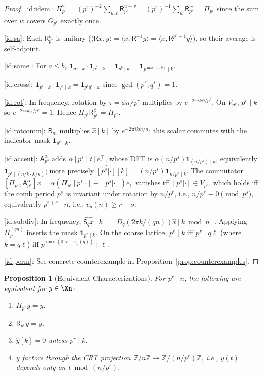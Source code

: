 \documentclass[11pt]{amsart}
\newtheorem{proposition}[theorem]{Proposition}
\newcommand{\Prj}{\Pi}
\newcommand{\Sp}{\mathsf{S}}
\newcommand{\Ap}{\mathsf{A}}
\newcommand{\Rp}{\mathsf{R}}
\newcommand{\vp}{v_p}
\newcommand{\Z}{\mathbb{Z}}
\begin{document}
\begin{proof}
\eqref{id:idem}: $\Prj_{p^r}^2 = (p^r)^{-2}\sum_{u,v}\Rp_{p^r}^{u+v} = (p^r)^{-1}\sum_w \Rp_{p^r}^w = \Prj_{p^r}$ since the sum over $w$ covers $G_{p^r}$ exactly once.

\eqref{id:sa}: Each $\Rp_{p^r}^u$ is unitary ($\langle \Rp x, y\rangle = \langle x, \Rp^{-1}y\rangle = \langle x, \Rp^{p^r - 1}y\rangle$), so their average is self-adjoint.

\eqref{id:same}: For $a \leq b$, $\mathbf{1}_{p^a \mid k} \cdot \mathbf{1}_{p^b \mid k} = \mathbf{1}_{p^b \mid k} = \mathbf{1}_{p^{\max(a,b)} \mid k}$.

\eqref{id:cross}: $\mathbf{1}_{p^r \mid k} \cdot \mathbf{1}_{q^s \mid k} = \mathbf{1}_{p^r q^s \mid k}$ since $\gcd(p^r, q^s) = 1$.

\eqref{id:rot}: In frequency, rotation by $\tau = \phi n/p^r$ multiplies by $e^{-2\pi i k \phi / p^r}$. On $V_{p^r}$, $p^r \mid k$ so $e^{-2\pi i k \phi / p^r} = 1$. Hence $\Prj_{p^r}\Rp_{p^r}^\phi = \Prj_{p^r}$.

\eqref{id:rotcomm}: $\Rp_m$ multiplies $\hat{x}[k]$ by $e^{-2\pi i k m/n}$; this scalar commutes with the indicator mask $\mathbf{1}_{p^r \mid k}$.

\eqref{id:accent}: $\Ap^\alpha_{p^s}$ adds $\alpha [p^s \mid t] e_1^\top$, whose DFT is $\alpha(n/p^s)\mathbf{1}_{(n/p^s) \mid k}$, equivalently $\mathbf{1}_{p^s \mid (n/k \cdot k/n)}$; more precisely $\widehat{[p^s|\cdot]}[k] = (n/p^s)\mathbf{1}_{n/p^s \mid k}$. The commutator $[\Prj_{p^r}, \Ap^\alpha_{p^s}]x = \alpha(\Prj_{p^r}[p^s|\cdot] - [p^s|\cdot])e_1$ vanishes iff $[p^s|\cdot] \in V_{p^r}$, which holds iff the comb period $p^s$ is invariant under rotation by $n/p^r$, i.e., $n/p^r \equiv 0 \pmod{p^s}$, equivalently $p^{r+s} \mid n$, i.e., $\vp(n) \geq r+s$.

\eqref{id:subdiv}: In frequency, $\widehat{\Sp_q x}[k] = D_q(2\pi k/(qn))\hat{x}[k \bmod n]$. Applying $\Prj^{(qn)}_{p^r}$ inserts the mask $\mathbf{1}_{p^r \mid k}$. On the coarse lattice, $p^r \mid k$ iff $p^r \mid q\ell$ (where $k = q\ell$) iff $p^{\max(0,r-\vp(q))} \mid \ell$.

\eqref{id:perm}: See concrete counterexample in Proposition~\ref{prop:counterexamples}.
\end{proof}

\begin{proposition}[Equivalent Characterizations]\label{prop:equiv}
For $p^r \mid n$, the following are equivalent for $y \in \Xn$:
\begin{enumerate}
  \item[(i)] $\Prj_{p^r} y = y$.
  \item[(ii)] $\Rp_{p^r} y = y$.
  \item[(iii)] $\hat{y}[k] = 0$ unless $p^r \mid k$.
  \item[(iv)] $y$ factors through the CRT projection $\Z/n\Z \twoheadrightarrow \Z/(n/p^r)\Z$, i.e., $y(t)$ depends only on $t \bmod (n/p^r)$.
\end{enumerate}
\end{proposition}
\end{document}
